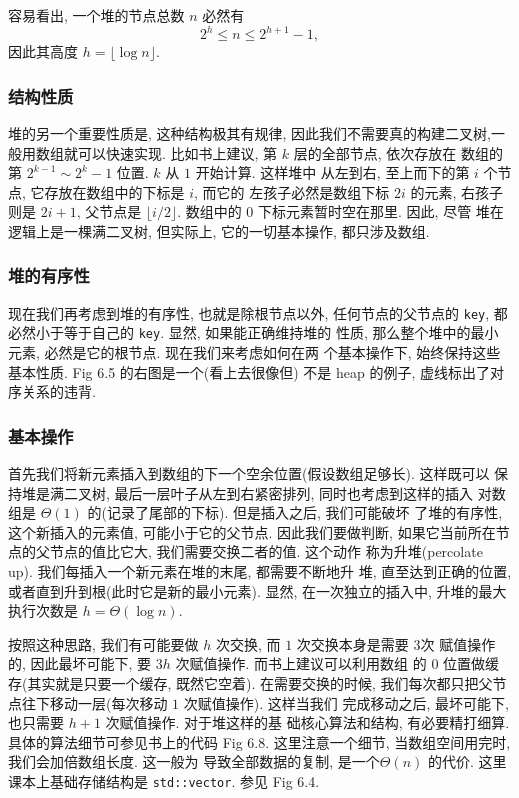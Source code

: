 \documentclass[a4paper]{ctexart}
\theoremstyle{definition}
\theoremstyle{definition}
\begin{document}
容易看出, 一个堆的节点总数 $n$ 必然有
$$
2^h \leq n \leq 2^{h + 1} - 1,
$$
因此其高度 $h = \lfloor \log n \rfloor$.

\subsubsection{结构性质}

堆的另一个重要性质是, 这种结构极其有规律, 因此我们不需要真的构建二叉树,一
般用数组就可以快速实现. 比如书上建议, 第 $k$ 层的全部节点, 依次存放在
数组的第 $2^{k-1} \sim 2^{k} - 1$ 位置. $k$ 从 $1$ 开始计算. 这样堆中
从左到右, 至上而下的第 $i$ 个节点, 它存放在数组中的下标是 $i$, 而它的
左孩子必然是数组下标 $2i$ 的元素, 右孩子则是 $2i + 1$, 父节点是
$\lfloor i / 2\rfloor$. 数组中的 $0$ 下标元素暂时空在那里. 因此, 尽管
堆在逻辑上是一棵满二叉树, 但实际上, 它的一切基本操作, 都只涉及数组.

\subsubsection{堆的有序性}

现在我们再考虑到堆的有序性, 也就是除根节点以外, 任何节点的父节点的
\verb|key|, 都必然小于等于自己的 \verb|key|. 显然, 如果能正确维持堆的
性质, 那么整个堆中的最小元素, 必然是它的根节点. 现在我们来考虑如何在两
个基本操作下, 始终保持这些基本性质. Fig 6.5 的右图是一个(看上去很像但)
不是 heap 的例子, 虚线标出了对序关系的违背.


\subsubsection{基本操作}
首先我们将新元素插入到数组的下一个空余位置(假设数组足够长). 这样既可以
保持堆是满二叉树, 最后一层叶子从左到右紧密排列, 同时也考虑到这样的插入
对数组是 $\Theta(1)$ 的(记录了尾部的下标). 但是插入之后, 我们可能破坏
了堆的有序性, 这个新插入的元素值, 可能小于它的父节点. 因此我们要做判断,
如果它当前所在节点的父节点的值比它大, 我们需要交换二者的值.  这个动作
称为升堆(percolate up). 我们每插入一个新元素在堆的末尾, 都需要不断地升
堆, 直至达到正确的位置, 或者直到升到根(此时它是新的最小元素).  显然,
在一次独立的插入中, 升堆的最大执行次数是 $h = \Theta(\log n)$.

按照这种思路, 我们有可能要做 $h$ 次交换, 而 $1$ 次交换本身是需要 $3$次
赋值操作的, 因此最坏可能下, 要 $3h$ 次赋值操作. 而书上建议可以利用数组
的 $0$ 位置做缓存(其实就是只要一个缓存, 既然它空着). 在需要交换的时候,
我们每次都只把父节点往下移动一层(每次移动 $1$ 次赋值操作). 这样当我们
完成移动之后, 最坏可能下, 也只需要 $h + 1$ 次赋值操作. 对于堆这样的基
础核心算法和结构, 有必要精打细算. 具体的算法细节可参见书上的代码 Fig
6.8. 这里注意一个细节, 当数组空间用完时, 我们会加倍数组长度. 这一般为
导致全部数据的复制, 是一个$\Theta(n)$ 的代价. 这里课本上基础存储结构是
\verb|std::vector|. 参见 Fig 6.4.
\end{document}
